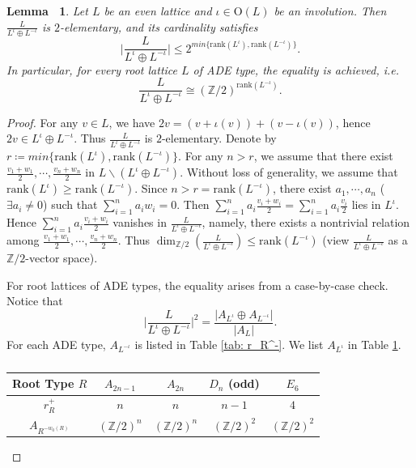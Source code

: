\documentclass[12pt,reqno,a4paper]{amsart}
\newtheorem{lem}[thm]{Lemma~}
\theoremstyle{remark}
\theoremstyle{definition}
\newcommand{\ZZ}{\mathbb{Z}}
\newcommand\Or{\mathrm{O}}
\newcommand{\rank}{\mathrm{rank}}
\newcommand{\bs}{\backslash}
\begin{document}
\begin{lem}
\label{lem: saturation induced by involution, inequality and ADE case}
    Let $L$ be an even lattice and $\iota\in \Or(L)$ be an involution.
    Then $\frac{L}{L^\iota \oplus L^{-\iota}}$ is $2$-elementary, and its cardinality satisfies
    \begin{equation*}
        \bigg|\frac{L}{L^\iota \oplus L^{-\iota}}\bigg| \le 2^{min\{\rank (L^\iota), \rank (L^{-\iota})\}}.
    \end{equation*}
    In particular, for every root lattice $L$ of ADE type, the equality is achieved, i.e. 
    \begin{equation*}
        \frac{L}{L^{\iota} \oplus L^{-\iota}} \cong (\ZZ/2)^{\rank (L^{-\iota})}.
    \end{equation*}
\end{lem}
\begin{proof}
    For any $v\in L$, we have $2v = (v+\iota(v))+(v-\iota(v))$, hence $2v\in L^{\iota} \oplus L^{-\iota}$.
    Thus $\frac{L}{L^\iota \oplus L^{-\iota}}$ is $2$-elementary.
    Denote by $r\coloneqq min\{\rank (L^\iota), \rank (L^{-\iota})\}$.
    For any $n>r$, we assume that there exist $\frac{v_1+w_1}{2},\cdots,\frac{v_n+w_n}{2}$ in $L\bs(L^{\iota} \oplus L^{-\iota})$.
    Without loss of generality, we assume that $\rank (L^\iota) \ge \rank (L^{-\iota})$.
    Since $n > r=\rank (L^{-\iota})$, there exist $a_1,\cdots,a_n$ ($\exists a_i\neq 0$) such that $\sum\limits_{i=1}^n a_i w_i = 0$.
    Then $\sum\limits_{i=1}^n a_i \frac{v_i+w_i}{2} = \sum\limits_{i=1}^n a_i \frac{v_i}{2}$ lies in $L^\iota$.
    Hence $\sum\limits_{i=1}^n a_i \frac{v_i+w_i}{2}$ vanishes in $\frac{L}{L^{\iota} \oplus L^{-\iota}}$, namely, there exists a nontrivial relation among $\frac{v_1+w_1}{2},\cdots,\frac{v_n+w_n}{2}$.
    Thus $\dim_{\ZZ/2}(\frac{L}{L^\iota \oplus L^{-\iota}}) \le \rank (L^{-\iota})$ (view $\frac{L}{L^\iota \oplus L^{-\iota}}$ as a $\ZZ/2$-vector space).

    For root lattices of ADE types, the equality arises from a case-by-case check.
    Notice that 
    \begin{equation*}
        \bigg|\frac{L}{L^\iota \oplus L^{-\iota}}\bigg|^2 = \frac{|A_{L^\iota} \oplus A_{L^{-\iota}}|}{|A_L|}.
    \end{equation*}
    For each ADE type, $A_{L^{-\iota}}$ is listed in Table \ref{tab: r_R^-}.
    We list $A_{L^\iota}$ in Table \ref{tab: r_R^+}.
    \begin{table}[htbp]  %
    \centering  %
    \caption{}  %
    \begin{tabular}{ccccc}
    \toprule
    Root Type $R$ & $A_{2n-1}$ & $A_{2n}$ & $D_{n}$ (odd) & $E_6$  \\  %
    \midrule
    $r_R^+$ & $n$ & $n$ & $n-1$ & $4$ \\ %
    $A_{R^{-w_0(R)}}$ & $(\ZZ/2)^{n}$ & $(\ZZ/2)^n$ & $(\ZZ/2)^2$ & $(\ZZ/2)^2$ \\  %
    \bottomrule
    \end{tabular}
    \label{tab: r_R^+}  %
    \end{table}
\end{proof}
\end{document}

